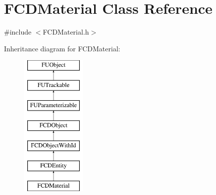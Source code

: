 \hypertarget{classFCDMaterial}{
\section{FCDMaterial Class Reference}
\label{classFCDMaterial}
}


{\ttfamily \#include $<$FCDMaterial.h$>$}

Inheritance diagram for FCDMaterial:\begin{figure}[H]
\begin{center}
\leavevmode
\includegraphics[height=7.000000cm]{classFCDMaterial}
\end{center}
\end{figure}
